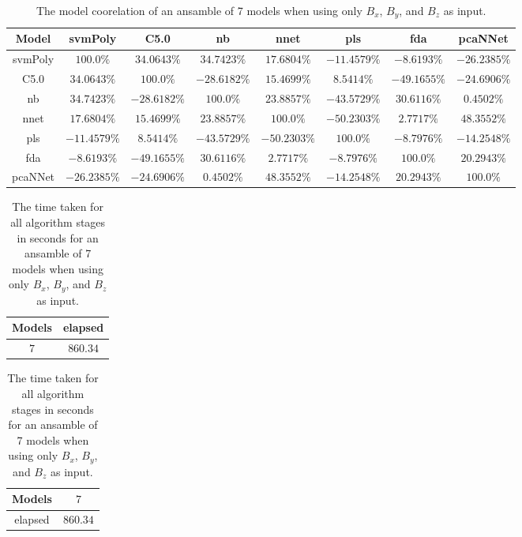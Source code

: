 \begin{table}[!ht]
	\centering
	\begin{tabular}{|c|c|c|c|c|c|c|c|}
		\hline
		Model & svmPoly & C5.0 & nb & nnet & pls & fda & pcaNNet \\ \hline
		svmPoly & $100.0\%$ & $34.0643\%$ & $34.7423\%$ & $17.6804\%$ & $-11.4579\%$ & $-8.6193\%$ & $-26.2385\%$ \\ \hline
		C5.0 & $34.0643\%$ & $100.0\%$ & $-28.6182\%$ & $15.4699\%$ & $8.5414\%$ & $-49.1655\%$ & $-24.6906\%$ \\ \hline
		nb & $34.7423\%$ & $-28.6182\%$ & $100.0\%$ & $23.8857\%$ & $-43.5729\%$ & $30.6116\%$ & $0.4502\%$ \\ \hline
		nnet & $17.6804\%$ & $15.4699\%$ & $23.8857\%$ & $100.0\%$ & $-50.2303\%$ & $2.7717\%$ & $48.3552\%$ \\ \hline
		pls & $-11.4579\%$ & $8.5414\%$ & $-43.5729\%$ & $-50.2303\%$ & $100.0\%$ & $-8.7976\%$ & $-14.2548\%$ \\ \hline
		fda & $-8.6193\%$ & $-49.1655\%$ & $30.6116\%$ & $2.7717\%$ & $-8.7976\%$ & $100.0\%$ & $20.2943\%$ \\ \hline
		pcaNNet & $-26.2385\%$ & $-24.6906\%$ & $0.4502\%$ & $48.3552\%$ & $-14.2548\%$ & $20.2943\%$ & $100.0\%$ \\ \hline
	\end{tabular}
	\caption{The model coorelation of an ansamble of 7 models when using only $B_{x}$, $B_{y}$, and $B_{z}$ as input.}
	\label{tab:ansamble7:coord}
\end{table}

\begin{table}[!ht]
	\centering
	\begin{tabular}{|c|c|}
		\hline
		Models & elapsed \\ \hline
		$7$ & $860.34$ \\ \hline
	\end{tabular}
	\caption{The time taken for all algorithm stages in seconds for an ansamble of 7 models when using only $B_{x}$, $B_{y}$, and $B_{z}$ as input.}
	\label{tab:time:ansamble:coord:7}
\end{table}

\begin{table}[!ht]
	\centering
	\begin{tabular}{|c|c|}
		\hline
		Models & $7$ \\ \hline
		elapsed & $860.34$ \\ \hline
	\end{tabular}
	\caption{The time taken for all algorithm stages in seconds for an ansamble of 7 models when using only $B_{x}$, $B_{y}$, and $B_{z}$ as input.}
	\label{tab:time:ansamble:reverse:coord:7}
\end{table}

